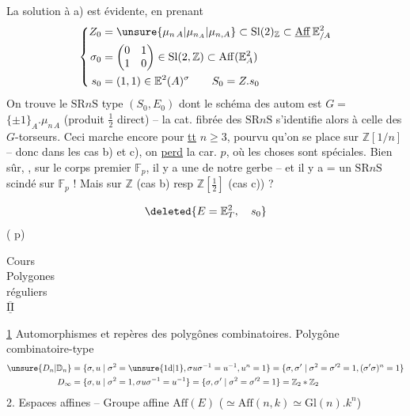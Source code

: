 La solution à a) est évidente, en prenant
\[
\left\{\begin{aligned}
Z_0&=\unsure{\mu_{n\,A}|\mu_{n_A}|\mu_{n,A}}\subset\mathrm{Sl}(2)_{\mathbb Z}\subset\underline{\mathrm{Aff}}\,\mathbb E^2_{/A}\\
\sigma_0&=\begin{pmatrix}0&1\\1&0\end{pmatrix}\in\mathrm{Sl}(2,\mathbb Z)\subset\mathrm{Aff}(\mathbb E_A^2)\\
s_0&=(1,1)\in\mathbb E^2(A)^\sigma\qquad S_0=Z.s_0
\end{aligned}\right.
\]
On trouve le  $\mathrm{SR}n\mathrm S$ type $(S_0,E_0)$
dont le schéma des autom est $G=$
$\{\pm1\}_A.\mu_{n\,A}$ (produit $\frac12$ direct) -- la
cat. fibrée des $\mathrm{SR}n\mathrm S$ s'identifie alors
à celle des $G$-torseurs. Ceci
marche encore pour \uline{tt} $n\geq3$, pourvu
qu'on se place sur $\mathbb Z[1/n]$ --
donc dans les cas b) et c), on \uline{perd}
la car. $p$, où les choses sont spéciales.
Bien sûr,  , sur le corps
premier $\mathbb F_p$, il y a une   de notre
gerbe -- et il y a = un $\mathrm{SR}n\mathrm S$
scindé sur $\mathbb F_p$ ! Mais sur $\mathbb Z$ (cas b)
resp $\mathbb Z[\frac12]$ (cas c)) ?

\[
\deleted{E=\mathbb E^2_T,\quad s_0}
\]
( p)

\begin{flushright}
Cours\\
Polygones\\
réguliers\\
$\overline{\underline{\mathrm{II}}}$
\end{flushright}
\uline{1} Automorphismes et repères des polygônes combinatoires. Polygône
combinatoire-type
\[
\begin{aligned}
\unsure{D_n|\mathbb D_n}&=\{\sigma,u\mid\sigma^2=\unsure{1\mathrm d|1},\sigma u\sigma^{-1}=u^{-1},u^n=1\}=\{\sigma,\sigma'\mid\sigma^2=\sigma'^{2}=1,(\sigma'\sigma)^n=1\}\\
D_\infty&=\{\sigma,u\mid\sigma^2=1,\sigma u\sigma^{-1}=u^{-1}\}=\{\sigma,\sigma'\mid\sigma^2=\sigma'^{2}=1\}=\mathbb Z_2*\mathbb Z_2
\end{aligned}
\]
2. Espaces affines -- Groupe affine $\mathrm{Aff}(E)$ ($\simeq\mathrm{Aff}(n,k)\simeq
\mathrm{Gl}(n).k^n$)

